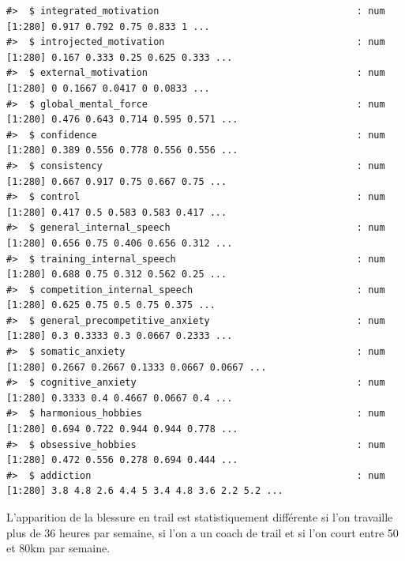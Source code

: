 \documentclass[
]{article}
\begin{document}
\begin{verbatim}
#>  $ integrated_motivation                                   : num [1:280] 0.917 0.792 0.75 0.833 1 ...
#>  $ introjected_motivation                                  : num [1:280] 0.167 0.333 0.25 0.625 0.333 ...
#>  $ external_motivation                                     : num [1:280] 0 0.1667 0.0417 0 0.0833 ...
#>  $ global_mental_force                                     : num [1:280] 0.476 0.643 0.714 0.595 0.571 ...
#>  $ confidence                                              : num [1:280] 0.389 0.556 0.778 0.556 0.556 ...
#>  $ consistency                                             : num [1:280] 0.667 0.917 0.75 0.667 0.75 ...
#>  $ control                                                 : num [1:280] 0.417 0.5 0.583 0.583 0.417 ...
#>  $ general_internal_speech                                 : num [1:280] 0.656 0.75 0.406 0.656 0.312 ...
#>  $ training_internal_speech                                : num [1:280] 0.688 0.75 0.312 0.562 0.25 ...
#>  $ competition_internal_speech                             : num [1:280] 0.625 0.75 0.5 0.75 0.375 ...
#>  $ general_precompetitive_anxiety                          : num [1:280] 0.3 0.3333 0.3 0.0667 0.2333 ...
#>  $ somatic_anxiety                                         : num [1:280] 0.2667 0.2667 0.1333 0.0667 0.0667 ...
#>  $ cognitive_anxiety                                       : num [1:280] 0.3333 0.4 0.4667 0.0667 0.4 ...
#>  $ harmonious_hobbies                                      : num [1:280] 0.694 0.722 0.944 0.944 0.778 ...
#>  $ obsessive_hobbies                                       : num [1:280] 0.472 0.556 0.278 0.694 0.444 ...
#>  $ addiction                                               : num [1:280] 3.8 4.8 2.6 4.4 5 3.4 4.8 3.6 2.2 5.2 ...
\end{verbatim}

L'apparition de la blessure en trail est statistiquement différente si
l'on travaille plus de 36 heures par semaine, si l'on a un coach de
trail et si l'on court entre 50 et 80km par semaine.
\end{document}
